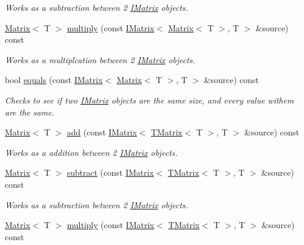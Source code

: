 \begin{DoxyCompactItemize}
\begin{DoxyCompactList}\small\item\em Works as a subtraction between 2 \mbox{\hyperlink{class_i_matrix}{I\+Matrix}} objects. \end{DoxyCompactList}\item 
\mbox{\hyperlink{class_matrix}{Matrix}}$<$ T $>$ \mbox{\hyperlink{class_s_matrix_a33fad429abe7b78533b909cce648722d}{multiply}} (const \mbox{\hyperlink{class_i_matrix}{I\+Matrix}}$<$ \mbox{\hyperlink{class_matrix}{Matrix}}$<$ T $>$, T $>$ \&source) const
\begin{DoxyCompactList}\small\item\em Works as a multiplcation between 2 \mbox{\hyperlink{class_i_matrix}{I\+Matrix}} objects. \end{DoxyCompactList}\item 
bool \mbox{\hyperlink{class_s_matrix_a0576b4cae95310f2acb9c3f5118c31ce}{equals}} (const \mbox{\hyperlink{class_i_matrix}{I\+Matrix}}$<$ \mbox{\hyperlink{class_matrix}{Matrix}}$<$ T $>$, T $>$ \&source) const
\begin{DoxyCompactList}\small\item\em Checks to see if two \mbox{\hyperlink{class_i_matrix}{I\+Matrix}} objects are the same size, and every value withem are the same. \end{DoxyCompactList}\item 
\mbox{\hyperlink{class_matrix}{Matrix}}$<$ T $>$ \mbox{\hyperlink{class_s_matrix_a573a5ccc8c40e1fce3e7f77cd5b2cfde}{add}} (const \mbox{\hyperlink{class_i_matrix}{I\+Matrix}}$<$ \mbox{\hyperlink{class_t_matrix}{T\+Matrix}}$<$ T $>$, T $>$ \&source) const
\begin{DoxyCompactList}\small\item\em Works as a addition between 2 \mbox{\hyperlink{class_i_matrix}{I\+Matrix}} objects. \end{DoxyCompactList}\item 
\mbox{\hyperlink{class_matrix}{Matrix}}$<$ T $>$ \mbox{\hyperlink{class_s_matrix_a6d1a4242c4ff9f151c8141fef7784f8d}{subtract}} (const \mbox{\hyperlink{class_i_matrix}{I\+Matrix}}$<$ \mbox{\hyperlink{class_t_matrix}{T\+Matrix}}$<$ T $>$, T $>$ \&source) const
\begin{DoxyCompactList}\small\item\em Works as a subtraction between 2 \mbox{\hyperlink{class_i_matrix}{I\+Matrix}} objects. \end{DoxyCompactList}\item 
\mbox{\hyperlink{class_matrix}{Matrix}}$<$ T $>$ \mbox{\hyperlink{class_s_matrix_a7152c62ca6b3a7b32737d66b064b198b}{multiply}} (const \mbox{\hyperlink{class_i_matrix}{I\+Matrix}}$<$ \mbox{\hyperlink{class_t_matrix}{T\+Matrix}}$<$ T $>$, T $>$ \&source) const

\end{DoxyCompactItemize}
